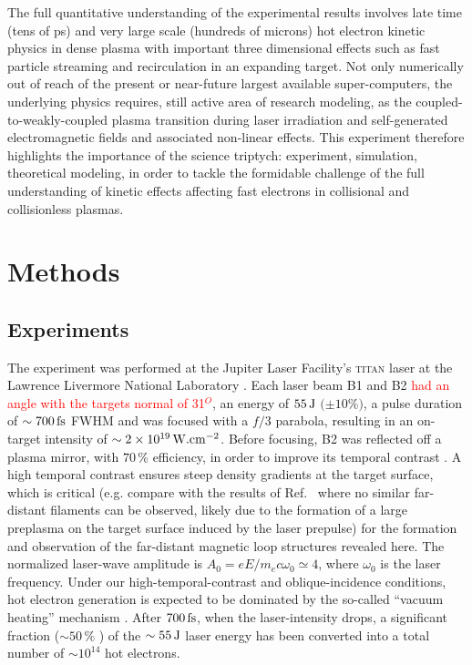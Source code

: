 \documentclass[aps,twocolumn,showpacs,superscriptaddress]{revtex4}
\begin{document}
The full quantitative understanding of the experimental results involves late time (tens of ps) and very large scale (hundreds of microns) hot electron kinetic physics in dense plasma  with important three dimensional  effects such as fast particle streaming and recirculation in an expanding target.
Not only numerically out of reach of the present or near-future largest available super-computers, the  underlying physics requires, still active area of research modeling, as the coupled-to-weakly-coupled plasma transition during laser irradiation  and self-generated electromagnetic fields and associated non-linear effects.
This experiment therefore highlights the importance of the science triptych:  experiment, simulation, theoretical modeling, in order  to tackle the formidable challenge of the  full understanding of kinetic effects affecting fast electrons in collisional and collisionless plasmas.


\section*{Methods}
\subsection*{Experiments}
The experiment %
was performed at the Jupiter Laser Facility's \textsc{titan} laser at the Lawrence Livermore National Laboratory \cite{RSI_Albertazzi_2015}. Each laser beam B1 and B2 \textcolor{red}{had an angle with the targets normal of 31$^O$}, an energy of $55\,\rm J$ $(\pm 10$\%$)$, a pulse duration of $\sim 700\,\rm fs$ FWHM and was focused with a $f/3$ parabola, resulting in an on-target intensity of $\sim 2\times 10^{19}\,\rm W.cm^{-2}$. Before focusing, B2 was reflected off a plasma mirror, with $70\,\%$ efficiency, in order to improve its temporal contrast \cite{PRE_Doumy_2004}. 
A high temporal contrast ensures steep density gradients at the target surface, which is critical (e.g. compare with the results of Ref.~\cite{PRL_Sarri_2012} where no similar far-distant filaments can be observed, likely due to the formation of a large preplasma on the target surface induced by the laser prepulse) for the formation and observation of the far-distant magnetic loop structures revealed here. The normalized laser-wave amplitude is $A_0 = eE/m_ec\omega_0 \simeq 4$, where $\omega_0$ is the laser frequency. Under our high-temporal-contrast and oblique-incidence conditions, hot electron generation is expected to be dominated by the so-called ``vacuum heating'' mechanism \cite{PRL_Brunel_1987}. After $700\,\rm fs$, when the laser-intensity drops, a significant fraction ($\sim 50\,\%$ \cite{PRL_Ping_2008}) of the $\sim 55\, \rm J$ laser energy has been converted into a total number of $\sim 10^{14}$ hot electrons.
\end{document}
